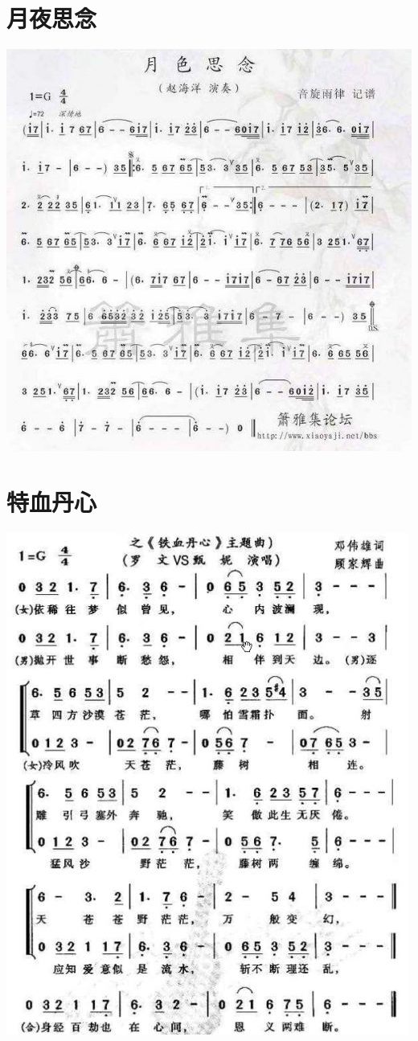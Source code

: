 \documentclass[cn,pad,chinese,chinesefont=nofont]{elegantbook}
\begin{document}
\section{月夜思念}
    \includegraphics[width=\textwidth]{dongxiao/月夜思念.jpg}
\section{特血丹心}
    \includegraphics[width=\textwidth]{dongxiao/铁血丹心.jpg}
    
\end{document}
